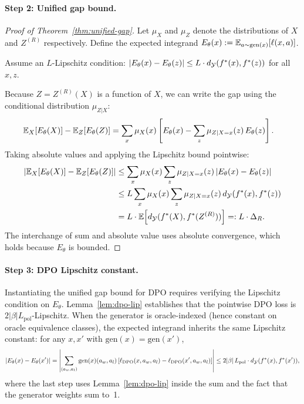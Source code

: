 \paragraph{Step 2: Unified gap bound.}

\begin{proof}[Proof of Theorem~\ref{thm:unified-gap}]
Let $\mu_X$ and $\mu_Z$ denote the distributions of $X$ and $Z^{(R)}$ respectively. Define the expected integrand $E_\theta(x) := \mathbb{E}_{a \sim \mathrm{gen}(x)}[\ell(x, a)]$.

Assume an $L$-Lipschitz condition: $|E_\theta(x) - E_\theta(z)| \le L \cdot d_{\mathcal{Y}}(f^\ast(x), f^\ast(z))$ for all $x, z$.

Because $Z = Z^{(R)}(X)$ is a function of $X$, we can write the gap using the conditional distribution $\mu_{Z|X}$:
\begin{align*}
\mathbb{E}_X[E_\theta(X)] - \mathbb{E}_Z[E_\theta(Z)]
&= \sum_x \mu_X(x) \left[ E_\theta(x) - \sum_z \mu_{Z|X=x}(z)\, E_\theta(z) \right].
\end{align*}
Taking absolute values and applying the Lipschitz bound pointwise:
\begin{align*}
\left|\mathbb{E}_X[E_\theta(X)] - \mathbb{E}_Z[E_\theta(Z)]\right|
&\le \sum_x \mu_X(x) \sum_z \mu_{Z|X=x}(z)\, |E_\theta(x) - E_\theta(z)| \\
&\le L \sum_x \mu_X(x) \sum_z \mu_{Z|X=x}(z)\, d_{\mathcal{Y}}(f^\ast(x), f^\ast(z)) \\
&= L \cdot \mathbb{E}\!\left[d_{\mathcal{Y}}(f^\ast(X), f^\ast(Z^{(R)}))\right] =: L \cdot \Delta_R.
\end{align*}
The interchange of sum and absolute value uses absolute convergence, which holds because $E_\theta$ is bounded.
\end{proof}

\paragraph{Step 3: DPO Lipschitz constant.}

Instantiating the unified gap bound for DPO requires verifying the Lipschitz condition on $E_\theta$. Lemma~\ref{lem:dpo-lip} establishes that the pointwise DPO loss is $2|\beta|L_{\mathrm{pol}}$-Lipschitz. When the generator is oracle-indexed (hence constant on oracle equivalence classes), the expected integrand inherits the same Lipschitz constant: for any $x, x'$ with $\mathrm{gen}(x) = \mathrm{gen}(x')$,
\[
|E_\theta(x) - E_\theta(x')| = \left|\sum_{(a_w, a_l)} \mathrm{gen}(x)(a_w, a_l)\, [\ell_{\mathrm{DPO}}(x, a_w, a_l) - \ell_{\mathrm{DPO}}(x', a_w, a_l)]\right| \le 2|\beta|\,L_{\mathrm{pol}} \cdot d_{\mathcal{Y}}(f^\ast(x), f^\ast(x')),
\]
where the last step uses Lemma~\ref{lem:dpo-lip} inside the sum and the fact that the generator weights sum to~1.

